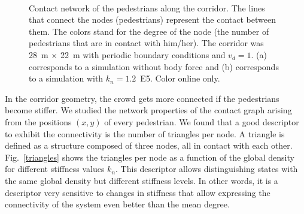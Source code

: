\documentclass[preprint,12pt]{elsarticle}
\begin{document}
\begin{figure}[!htbp]
\centering
    \ 
    \\
\caption[width=0.47\columnwidth]{Contact network of the pedestrians along the corridor. The lines that connect the nodes (pedestrians) represent the contact between them. The colors stand for the degree of the node (the number of pedestrians that are in contact with him/her). The corridor was 28~m $\times$ 22~m with periodic boundary conditions and $v_d=1$. (a) corresponds to a simulation without body force and (b) corresponds to a simulation with $k_n=1.2$~E5. Color online only.}
\label{network_corridor}
\end{figure}

In the corridor geometry, the crowd gets more connected if the pedestrians become stiffer. We studied the network properties of the contact graph arising from the positions $(x,y)$ of every pedestrian. We found that a good descriptor to exhibit the connectivity is the number of triangles per node. A triangle is defined as a structure composed of three nodes, all in contact with each other. Fig.~\ref{triangles} shows the triangles per node as a function of the global density for different stiffness values $k_n$. This descriptor allows distinguishing states with the same global density but different stiffness levels. In other words, it is a descriptor very sensitive to changes in stiffness that allow expressing the connectivity of the system even better than the mean degree. \\
\end{document}

